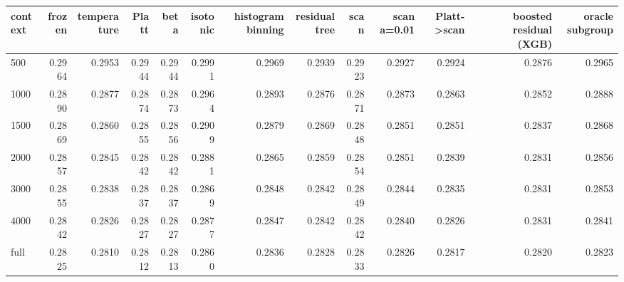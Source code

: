 \begin{tabular}{lrrrrrrrrrrrr}
\toprule
context & frozen & temperature & Platt & beta & isotonic & histogram binning & residual tree & scan & scan a=0.01 & Platt->scan & boosted residual (XGB) & oracle subgroup \\
\midrule
500 & 0.2964 & 0.2953 & 0.2944 & 0.2944 & 0.2991 & 0.2969 & 0.2939 & 0.2923 & 0.2927 & 0.2924 & 0.2876 & 0.2965 \\
1000 & 0.2890 & 0.2877 & 0.2874 & 0.2873 & 0.2964 & 0.2893 & 0.2876 & 0.2871 & 0.2873 & 0.2863 & 0.2852 & 0.2888 \\
1500 & 0.2869 & 0.2860 & 0.2855 & 0.2856 & 0.2909 & 0.2879 & 0.2869 & 0.2848 & 0.2851 & 0.2851 & 0.2837 & 0.2868 \\
2000 & 0.2857 & 0.2845 & 0.2842 & 0.2842 & 0.2881 & 0.2865 & 0.2859 & 0.2854 & 0.2851 & 0.2839 & 0.2831 & 0.2856 \\
3000 & 0.2855 & 0.2838 & 0.2837 & 0.2837 & 0.2869 & 0.2848 & 0.2842 & 0.2849 & 0.2844 & 0.2835 & 0.2831 & 0.2853 \\
4000 & 0.2842 & 0.2826 & 0.2827 & 0.2827 & 0.2877 & 0.2847 & 0.2842 & 0.2842 & 0.2840 & 0.2826 & 0.2831 & 0.2841 \\
full & 0.2825 & 0.2810 & 0.2812 & 0.2813 & 0.2860 & 0.2836 & 0.2828 & 0.2833 & 0.2826 & 0.2817 & 0.2820 & 0.2823 \\
\bottomrule
\end{tabular}

